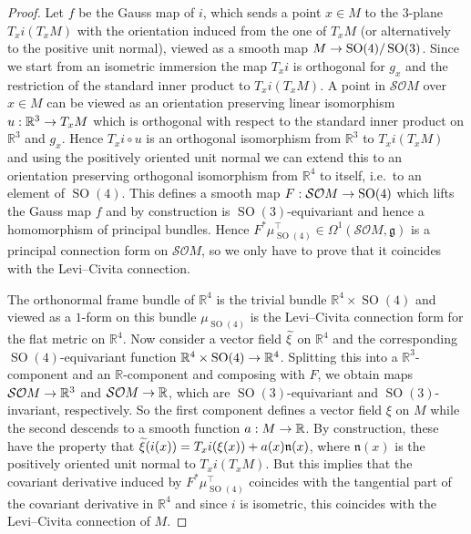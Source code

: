 \documentclass[AHL,Unicode,longabstracts]{cedram}
\newcommand{\x}{\times}
\renewcommand{\o}{\circ}
\newcommand{\Om}{\Omega}
\DeclareMathOperator{\SO}{SO}
\newcommand*{\R}{\mathbb{R}}
\newcommand{\fkg}{\mathfrak{g}}
\newcommand{\fkn}{\mathfrak{n}}
\newcommand{\clSO}{\mathcal{SO}}
\renewcommand*{\to}{\mathchoice{\longrightarrow}{\rightarrow}{\rightarrow}{\rightarrow}}
\let\oldtilde\tilde
\renewcommand*{\tilde}[1]{\mathchoice{\widetilde{#1}}{\widetilde{#1}}{\oldtilde{#1}}{\oldtilde{#1}}}
\newcommand*{\R}{\mathbb{R}}
\begin{document}
\begin{proof}
Let $f$ be the Gauss map of $i$, which sends a point $x\in M$ to the $3$-plane $T_xi(T_xM)$ with the orientation induced from the one of $T_xM$ (or alternatively to the positive unit normal), viewed as a smooth map $M\to
\SO(4)/\SO(3)$. Since we start from an isometric immersion the map $T_xi$ is orthogonal for $g_x$ and the restriction of the standard inner product to $T_xi(T_xM)$. A point in $\clSO M$ over $x\in M$ can be viewed as an orientation preserving linear isomorphism $u: \R^3\to T_xM$ which is orthogonal with respect to the standard inner product on $\R^3$ and $g_x$. Hence $T_xi\o u$ is an orthogonal isomorphism from $\R^3$ to $T_xi(T_xM)$ and using the positively oriented unit normal we can extend this to an orientation preserving orthogonal isomorphism from $\R^4$ to itself, i.e.\ to an element of $\SO(4)$. This defines a smooth map $F:
\clSO M\to \SO(4)$ which lifts the Gauss map $f$ and by construction is $\SO(3)$-equivariant and hence a homomorphism of principal bundles. Hence $F^*\mu_{\SO(4)}^\top\in\Om^1(\clSO M,\fkg)$ is a principal connection form on $\clSO M$, so we only have to prove that it coincides with the Levi--Civita connection.

The orthonormal frame bundle of $\R^4$ is the trivial bundle $\R^4\x \SO(4)$ and viewed as a $1$-form on this bundle $\mu_{\SO(4)}$ is the Levi--Civita connection form for the flat metric on $\R^4$. Now consider a vector field $\tilde\xi$ on $\R^4$ and the corresponding $\SO(4)$-equivariant function $\R^4\x \SO(4)\to\R^4$. Splitting this into a $\R^3$-component and an $\R$-component and composing with $F$, we obtain maps $\clSO M\to\R^3$ and $\clSO M\to\R$, which are $\SO(3)$-equivariant and $\SO(3)$-invariant, respectively. So the first component defines a vector field $\xi$ on $M$ while the second descends to a smooth function $a: M\to\R$. By construction, these have the property that $\tilde\xi(i(x))=T_xi(\xi(x))+a(x)\fkn(x)$, where $\fkn(x)$ is the positively oriented unit normal to $T_xi(T_xM)$. But this implies that the covariant derivative induced by $F^*\mu_{\SO(4)}^\top$ coincides with the tangential part of the covariant derivative in $\R^4$ and since $i$ is isometric, this coincides with the Levi--Civita connection of $M$.
\end{proof}
\end{document}
